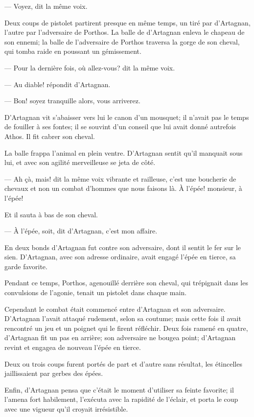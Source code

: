 — Voyez, dit la même voix.

Deux coups de pistolet partirent presque en même temps, un tiré par d'Artagnan, l'autre par l'adversaire de Porthos. La balle de d'Artagnan enleva le chapeau de son ennemi; la balle de l'adversaire de Porthos traversa la gorge de son cheval, qui tomba raide en poussant un gémissement.

— Pour la dernière fois, où allez-vous? dit la même voix.

— Au diable! répondit d'Artagnan.

— Bon! soyez tranquille alors, vous arriverez.

D'Artagnan vit s'abaisser vers lui le canon d'un mousquet; il n'avait pas le temps de fouiller à ses fontes; il se souvint d'un conseil que lui avait donné autrefois Athos. Il fit cabrer son cheval.

La balle frappa l'animal en plein ventre. D'Artagnan sentit qu'il manquait sous lui, et avec son agilité merveilleuse se jeta de côté.

— Ah çà, mais! dit la même voix vibrante et railleuse, c'est une boucherie de chevaux et non un combat d'hommes que nous faisons là. À l'épée! monsieur, à l'épée!

Et il sauta à bas de son cheval.

— À l'épée, soit, dit d'Artagnan, c'est mon affaire.

En deux bonds d'Artagnan fut contre son adversaire, dont il sentit le fer sur le sien. D'Artagnan, avec son adresse ordinaire, avait engagé l'épée en tierce, sa garde favorite.

Pendant ce temps, Porthos, agenouillé derrière son cheval, qui trépignait dans les convulsions de l'agonie, tenait un pistolet dans chaque main.

Cependant le combat était commencé entre d'Artagnan et son adversaire. D'Artagnan l'avait attaqué rudement, selon sa coutume; mais cette fois il avait rencontré un jeu et un poignet qui le firent réfléchir. Deux fois ramené en quatre, d'Artagnan fit un pas en arrière; son adversaire ne bougea point; d'Artagnan revint et engagea de nouveau l'épée en tierce.

Deux ou trois coups furent portés de part et d'autre sans résultat, les étincelles jaillissaient par gerbes des épées.

Enfin, d'Artagnan pensa que c'était le moment d'utiliser sa feinte favorite; il l'amena fort habilement, l'exécuta avec la rapidité de l'éclair, et porta le coup avec une vigueur qu'il croyait irrésistible.

